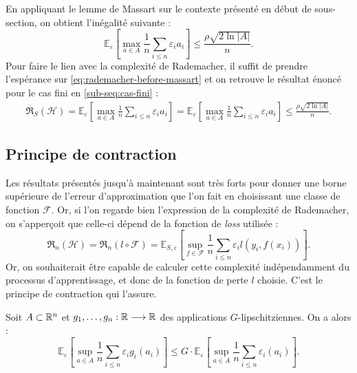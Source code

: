 \begin{proposition}
    En appliquant le lemme de Massart sur le contexte présenté en début de sous-section, on obtient l'inégalité suivante : 
    \begin{equation}
        \mathbb{E}_\varepsilon \left[ \underset{a \in A}{\max} \frac{1}{n} \sum_{i \leqslant n} \varepsilon_i a_i \right] \leqslant \frac{ \rho \sqrt{2 \ln|A|}}{n}. 
    \end{equation}
    Pour faire le lien avec la complexité de Rademacher, il suffit de prendre l'espérance sur \ref{eq:rademacher-before-massart} et on retrouve le résultat énoncé pour le cas fini en \ref{sub-seq:cas-fini} : 
    \begin{align}
        \mathfrak{R}_S( \mathcal{H}) = \mathbb{E}_\varepsilon \left[ \underset{a \in A}{\max} \frac{1}{n} \sum_{i \leqslant n} \varepsilon_i a_i \right]
        = \mathbb{E}_\varepsilon \left[ \underset{a \in A}{\max} \frac{1}{n} \sum_{i \leqslant n} \varepsilon_i a_i\right] 
        \leqslant \frac{ \rho \sqrt{2 \ln|A|}}{n}. 
    \end{align}
\end{proposition}

\subsection{Principe de contraction}

Les résultats présentés jusqu'à maintenant sont très forts pour donner une borne supérieure de l'erreur d'approximation que l'on fait en choisissant une classe de fonction $ \mathcal{F}$. Or, si l'on regarde bien l'expression de la complexité de Rademacher, on s'apperçoit que celle-ci dépend de la fonction de \emph{loss} utilisée : 
\begin{equation}
    \mathfrak{R}_n( \mathcal{H}) = \mathfrak{R}_n(l \circ \mathcal{F}) = \mathbb{E}_{S, \varepsilon} \left[ \underset{f \in \mathcal{F}}{\sup} \frac{1}{n} \sum_{i \leqslant n} \varepsilon_i l(y_i, f(x_i))\right]. 
\end{equation}
Or, on souhaiterait être capable de calculer cette complexité indépendamment du processus d'apprentissage, et donc de la fonction de perte $l$ choisie. C'est le principe de contraction qui l'assure. 

\begin{proposition}
    Soit $ A \subset \mathbb{R}^n$ et $g_1, \dots, g_n : \mathbb{R} \longrightarrow \mathbb{R}$ des applications $G$-lipschitziennes. On a alors : 
    \begin{equation}
        \mathbb{E}_{ \varepsilon} \left[ \underset{a \in A}{\sup} \frac{1}{n} \sum_{i \leqslant n} \varepsilon_i g_i(a_i)\right] \leqslant G \cdot \mathbb{E}_{ \varepsilon} \left[ \underset{a \in A}{\sup} \frac{1}{n} \sum_{i \leqslant n} \varepsilon_i (a_i)\right]. 
    \end{equation}
\end{proposition}

